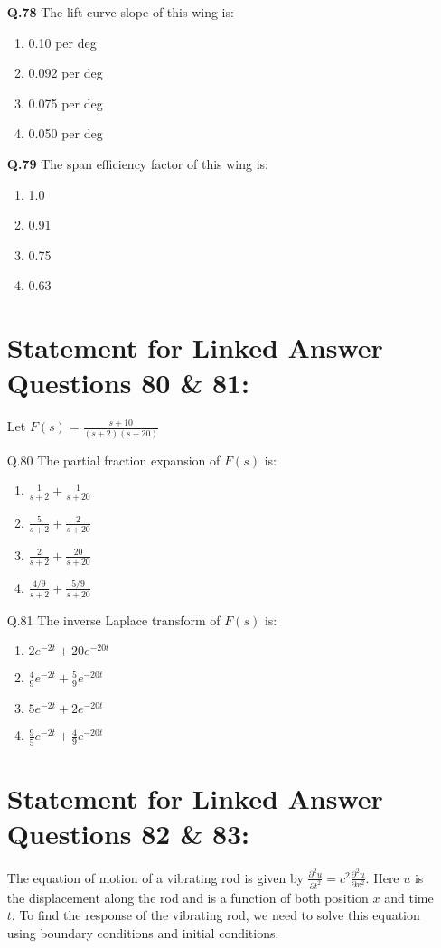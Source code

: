 \documentclass[journal]{IEEEtran}
\begin{document}
\begin{enumerate}
\textbf{Q.78} The lift curve slope of this wing is:
\begin{enumerate}
    \item  0.10 per deg
    \item  0.092 per deg
    \item  0.075 per deg
    \item  0.050 per deg\\
\end{enumerate}

\textbf{Q.79} The span efficiency factor of this wing is:
\begin{enumerate}
    \item  1.0
    \item  0.91
    \item  0.75
    \item  0.63\\
\end{enumerate}

\section*{Statement for Linked Answer Questions 80 \& 81:}
Let $F(s) = \frac{s+10}{(s+2)(s+20)}$\\

\item[Q.80] The partial fraction expansion of $F(s)$ is:
\begin{enumerate}
    \item  $\frac{1}{s+2} + \frac{1}{s+20}$
    \item  $\frac{5}{s+2} + \frac{2}{s+20}$
    \item  $\frac{2}{s+2} + \frac{20}{s+20}$
    \item  $\frac{4/9}{s+2} + \frac{5/9}{s+20}$\\
\end{enumerate}

\item[Q.81] The inverse Laplace transform of $F(s)$ is:
\begin{enumerate}
    \item  $2e^{-2t} + 20e^{-20t}$
    \item  $\frac{4}{9}e^{-2t} + \frac{5}{9}e^{-20t}$
    \item  $5e^{-2t} + 2e^{-20t}$
    \item  $\frac{9}{5}e^{-2t} + \frac{4}{9}e^{-20t}$\\
\end{enumerate}

\section*{Statement for Linked Answer Questions 82 \& 83:}
The equation of motion of a vibrating rod is given by $\frac{\partial^2 u}{\partial t^2} = c^2 \frac{\partial^2 u}{\partial x^2}$. Here $u$ is the displacement along the rod and is a function of both position $x$ and time $t$. To find the response of the vibrating rod, we need to solve this equation using boundary conditions and initial conditions.\\


\end{enumerate}
\end{document}
